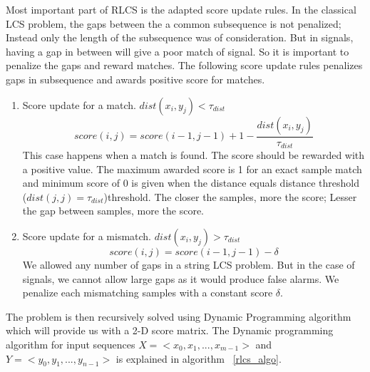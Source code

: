 \documentclass[MTech]{iitmdiss}
\begin{document}
Most important part of RLCS is the adapted score update rules. In the classical LCS problem, the gaps between the a common subsequence is not penalized; Instead only the length of the subsequence was of consideration. But in signals, having a gap in between will give a poor match of signal. So it is important to penalize the gaps and reward matches.
The following score update rules penalizes gaps in subsequence and awards positive score for matches.
\begin{enumerate}
  \item Score update for a match. $dist(x_i, y_j) < \tau_{dist}$\\
  $$score(i, j) = score(i - 1, j - 1) + 1 - \frac{dist(x_i, y_j)}{\tau_{dist}}$$
  This case happens when a match is found. The score should be rewarded with a positive value.  The maximum awarded score is 1 for an exact sample match and minimum score of 0 is given when the distance equals distance threshold ($dist(j, j) = \tau_{dist}$)threshold. The closer the samples, more the score; Lesser the gap between samples, more the score.
  \item Score update for a mismatch. $dist(x_i, y_j) > \tau_{dist}$\\
  $$score(i, j) = score(i - 1, j - 1) - \delta$$
  We allowed any number of gaps in a string LCS problem. But in the case of signals, we cannot allow large gaps as it would produce false alarms. We penalize each mismatching samples with a constant score $\delta$.
\end{enumerate}
The problem is then recursively solved using  Dynamic Programming algorithm which will provide us with a 2-D score matrix. The Dynamic programming algorithm for input sequences $X = <x_0, x_1, ..., x_{m-1}>$ and $Y = <y_0, y_1, ..., y_{n-1}>$ is explained in algorithm ~\ref{rlcs_algo}.
\end{document}
